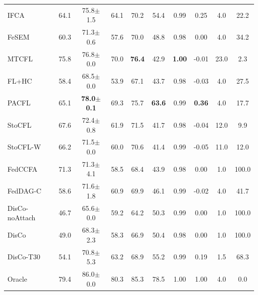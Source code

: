 {\begin{tabular}{lccccccccc}
IFCA & 64.1 & 75.8$\pm$1.5 & 64.1 & 70.2 & 54.4 & 0.99 & 0.25 & 4.0 & 22.2 \\
FeSEM & 60.3 & 71.3$\pm$0.6 & 57.6 & 70.0 & 48.8 & 0.98 & 0.00 & 4.0 & 34.2 \\
MTCFL & 75.8 & 76.8$\pm$0.0 & 70.0 & \textbf{76.4} & 42.9 & \textbf{1.00} & -0.01 & 23.0 & 2.3 \\
FL+HC & 58.4 & 68.5$\pm$0.0 & 53.9 & 67.1 & 43.7 & 0.98 & -0.03 & 4.0 & 27.5 \\
PACFL & 65.1 & \textbf{78.0$\pm$0.1} & 69.3 & 75.7 & \textbf{63.6} & 0.99 & \textbf{0.36} & 4.0 & 17.7 \\
StoCFL & 67.6 & 72.4$\pm$0.8 & 61.9 & 71.5 & 41.7 & 0.98 & -0.04 & 12.0 & 9.9 \\
StoCFL-W & 66.2 & 71.5$\pm$0.0 & 60.0 & 70.6 & 41.4 & 0.99 & -0.05 & 11.0 & 12.0 \\
FedCCFA & 71.3 & 71.3$\pm$4.1 & 58.5 & 68.4 & 43.9 & 0.98 & 0.00 & 1.0 & 100.0 \\
FedDAG-C & 58.6 & 71.6$\pm$1.8 & 60.9 & 69.9 & 46.1 & 0.99 & -0.02 & 4.0 & 41.7 \\
DisCo-noAttach & 46.7 & 65.6$\pm$0.0 & 59.2 & 64.2 & 50.3 & 0.99 & 0.00 & 1.0 & 100.0 \\
DisCo & 49.0 & 68.3$\pm$2.3 & 58.3 & 66.9 & 50.4 & 0.98 & 0.00 & 1.0 & 100.0 \\
DisCo-T30 & 54.1 & 70.8$\pm$5.3 & 63.2 & 68.9 & 55.2 & 0.99 & 0.19 & 1.5 & 68.3 \\
Oracle & 79.4 & 86.0$\pm$0.0 & 80.3 & 85.3 & 78.5 & 1.00 & 1.00 & 4.0 & 0.0 \\
\bottomrule
\end{tabular}}
